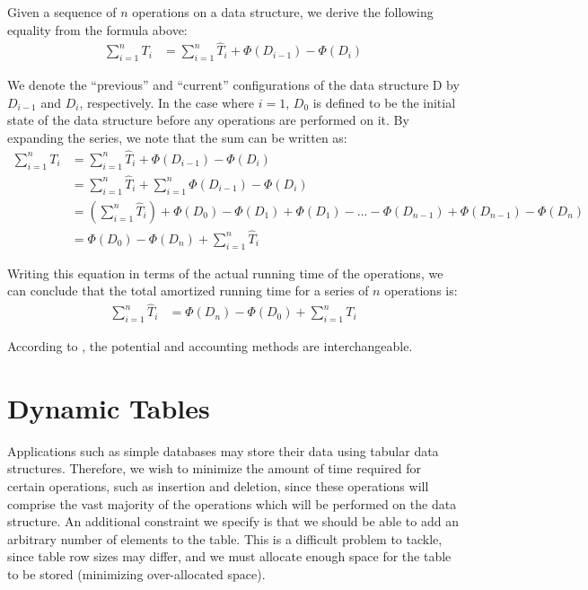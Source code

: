 \documentclass[12pt]{article}
\begin{document}
Given a sequence of $n$ operations on a data structure, we derive the following equality from the formula above:
\begin{align}
\sum_{i=1}^{n} T_i &= \sum_{i=1}^{n} \hat{T}_i + \Phi(D_{i-1}) - \Phi(D_{i})
\end{align}

We denote the ``previous'' and ``current'' configurations of the data structure D by $D_{i-1}$ and $D_{i}$, respectively. In the case where $i=1$, $D_0$ is defined to be the initial state of the data structure before any operations are performed on it. By expanding the series, we note that the sum can be written as:
\begin{align}
\sum_{i=1}^{n} T_i &= \sum_{i=1}^{n} \hat{T}_i + \Phi(D_{i-1}) - \Phi(D_{i}) \\
&= \sum_{i=1}^{n} \hat{T}_i + \sum_{i=1}^{n} \Phi(D_{i-1}) - \Phi(D_{i}) \\
&= \left( \sum_{i=1}^{n} \hat{T}_i \right) + \Phi(D_0) - \Phi(D_1) + \Phi(D_1) - ... - \Phi(D_{n-1}) + \Phi(D_{n-1}) - \Phi(D_n) \\
&= \Phi(D_0) - \Phi(D_n) + \sum_{i=1}^{n} \hat{T}_i
\end{align}

Writing this equation in terms of the actual running time of the operations, we can conclude that the total amortized running time for a series of $n$ operations is:
\begin{align}
\sum_{i=1}^{n} \hat{T}_{i} &= \Phi(D_n) - \Phi(D_0) + \sum_{i=1}^{n} T_{i}
\end{align}

According to \cite{Tarjan85}, the potential and accounting methods are interchangeable. 


\section{Dynamic Tables}
Applications such as simple databases may store their data using tabular data structures. Therefore, we wish to minimize the amount of time required for certain operations, such as insertion and deletion, since these operations will comprise the vast majority of the operations which will be performed on the data structure. An additional constraint we specify is that we should be able to add an arbitrary number of elements to the table. This is a difficult problem to tackle, since table row sizes may differ, and we must allocate enough space for the table to be stored (minimizing over-allocated space). \\
\end{document}
